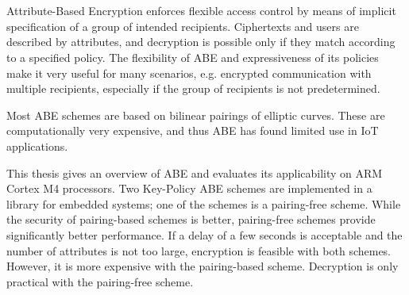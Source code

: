 \chapter{\abstractname}


Attribute-Based Encryption enforces flexible access control by means of implicit specification of a group of intended recipients.
Ciphertexts and users are described by attributes, and decryption is possible only if they match according to a specified policy.
The flexibility of ABE and expressiveness of its policies make it very useful for many scenarios, e.g. encrypted communication with multiple recipients, especially if the group of recipients is not predetermined.

Most ABE schemes are based on bilinear pairings of elliptic curves.
These are computationally very expensive, and thus ABE has found limited use in IoT applications.

This thesis gives an overview of ABE and evaluates its applicability on ARM Cortex M4 processors.
Two Key-Policy ABE schemes are implemented in a library for embedded systems; one of the schemes is a pairing-free scheme.
While the security of pairing-based schemes is better, pairing-free schemes provide significantly better performance.
If a delay of a few seconds is acceptable and the number of attributes is not too large, encryption is feasible with both schemes.
However, it is more expensive with the pairing-based scheme.
Decryption is only practical with the pairing-free scheme.
